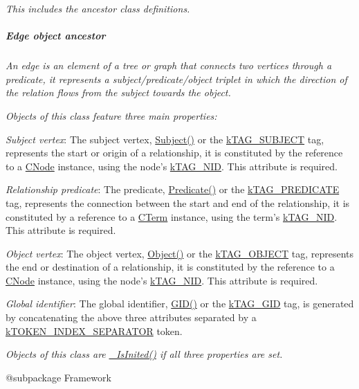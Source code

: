 {\itshape This includes the ancestor class definitions. \subparagraph*{Edge object ancestor}}

{\itshape }

{\itshape An edge is an element of a tree or graph that connects two vertices through a predicate, it represents a subject/predicate/object triplet in which the direction of the relation flows from the subject towards the object.}

{\itshape Objects of this class feature three main properties\-:}

{\itshape 
\begin{DoxyItemize}
\item {\itshape Subject vertex}\-: The subject vertex, {\ttfamily \hyperlink{}{Subject()}} or the {\ttfamily \hyperlink{}{k\-T\-A\-G\-\_\-\-S\-U\-B\-J\-E\-C\-T}} tag, represents the start or origin of a relationship, it is constituted by the reference to a \hyperlink{class_c_node}{C\-Node} instance, using the node's \hyperlink{}{k\-T\-A\-G\-\_\-\-N\-I\-D}. This attribute is required. 
\item {\itshape Relationship predicate}\-: The predicate, {\ttfamily \hyperlink{}{Predicate()}} or the {\ttfamily \hyperlink{}{k\-T\-A\-G\-\_\-\-P\-R\-E\-D\-I\-C\-A\-T\-E}} tag, represents the connection between the start and end of the relationship, it is constituted by a reference to a \hyperlink{class_c_term}{C\-Term} instance, using the term's \hyperlink{}{k\-T\-A\-G\-\_\-\-N\-I\-D}. This attribute is required. 
\item {\itshape Object vertex}\-: The object vertex, {\ttfamily \hyperlink{}{Object()}} or the {\ttfamily \hyperlink{}{k\-T\-A\-G\-\_\-\-O\-B\-J\-E\-C\-T}} tag, represents the end or destination of a relationship, it is constituted by the reference to a \hyperlink{class_c_node}{C\-Node} instance, using the node's \hyperlink{}{k\-T\-A\-G\-\_\-\-N\-I\-D}. This attribute is required. 
\item {\itshape Global identifier}\-: The global identifier, {\ttfamily \hyperlink{}{G\-I\-D()}} or the {\ttfamily \hyperlink{}{k\-T\-A\-G\-\_\-\-G\-I\-D}} tag, is generated by concatenating the above three attributes separated by a \hyperlink{}{k\-T\-O\-K\-E\-N\-\_\-\-I\-N\-D\-E\-X\-\_\-\-S\-E\-P\-A\-R\-A\-T\-O\-R} token. 
\end{DoxyItemize}}

{\itshape Objects of this class are \hyperlink{}{\-\_\-\-Is\-Inited()} if all three properties are set.}

{\itshape \begin{DoxyVerb} @subpackage        Framework\end{DoxyVerb}
}

